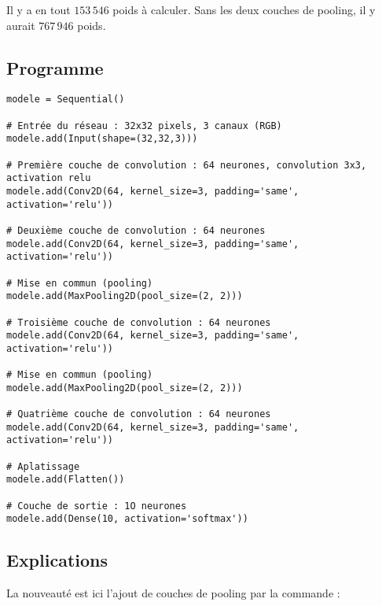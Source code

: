 \documentclass[11pt,class=report,crop=false]{standalone}
\begin{document}
 
 
Il y a en tout $153\,546$ poids à calculer. 
Sans les deux couches de pooling, il y aurait $767\,946$ poids.

\subsection{Programme}

\begin{lstlisting}
modele = Sequential()

# Entrée du réseau : 32x32 pixels, 3 canaux (RGB)
modele.add(Input(shape=(32,32,3)))

# Première couche de convolution : 64 neurones, convolution 3x3, activation relu
modele.add(Conv2D(64, kernel_size=3, padding='same', activation='relu'))

# Deuxième couche de convolution : 64 neurones
modele.add(Conv2D(64, kernel_size=3, padding='same', activation='relu'))

# Mise en commun (pooling)
modele.add(MaxPooling2D(pool_size=(2, 2)))

# Troisième couche de convolution : 64 neurones
modele.add(Conv2D(64, kernel_size=3, padding='same', activation='relu'))

# Mise en commun (pooling)
modele.add(MaxPooling2D(pool_size=(2, 2)))

# Quatrième couche de convolution : 64 neurones
modele.add(Conv2D(64, kernel_size=3, padding='same', activation='relu'))

# Aplatissage 
modele.add(Flatten())

# Couche de sortie : 1O neurones
modele.add(Dense(10, activation='softmax'))
\end{lstlisting}

\subsection{Explications}

La nouveauté est ici l'ajout de couches de pooling par la commande :

\end{document}
